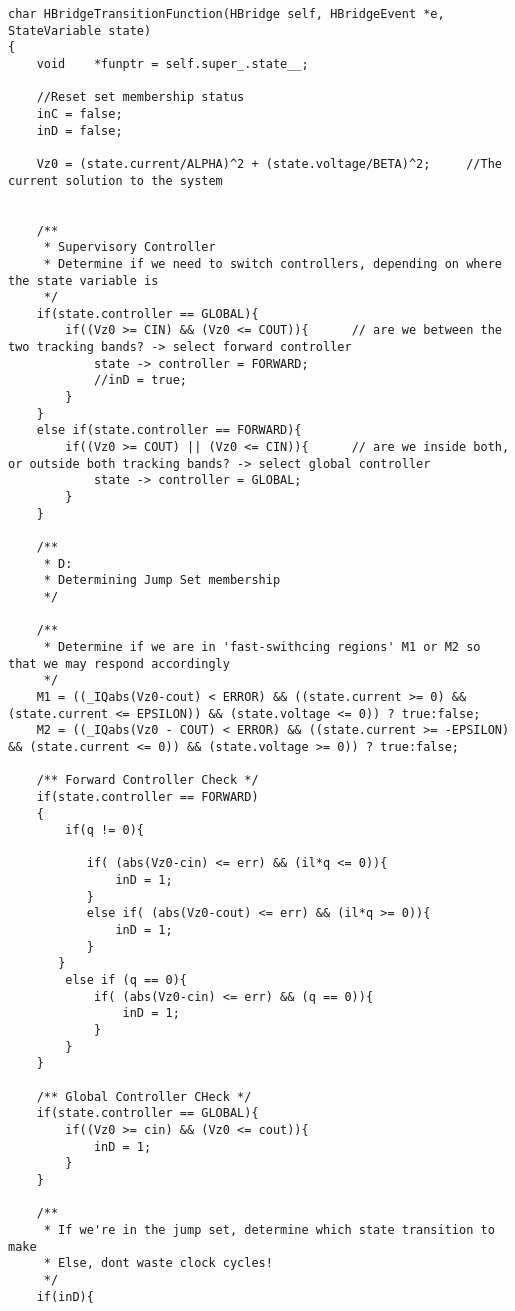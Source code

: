 \begin{lstlisting}
char HBridgeTransitionFunction(HBridge self, HBridgeEvent *e, StateVariable state)
{
    void    *funptr = self.super_.state__;    
    
    //Reset set membership status
    inC = false;   
    inD = false;

    Vz0 = (state.current/ALPHA)^2 + (state.voltage/BETA)^2;		//The current solution to the system


    /**
     * Supervisory Controller 
     * Determine if we need to switch controllers, depending on where the state variable is
     */
    if(state.controller == GLOBAL){
        if((Vz0 >= CIN) && (Vz0 <= COUT)){      // are we between the two tracking bands? -> select forward controller
            state -> controller = FORWARD;
            //inD = true;
        }
    }
    else if(state.controller == FORWARD){
        if((Vz0 >= COUT) || (Vz0 <= CIN)){      // are we inside both, or outside both tracking bands? -> select global controller
            state -> controller = GLOBAL;
        }
    }

    /**
     * D:
     * Determining Jump Set membership
     */
    
    /**
     * Determine if we are in 'fast-swithcing regions' M1 or M2 so that we may respond accordingly
     */
    M1 = ((_IQabs(Vz0-cout) < ERROR) && ((state.current >= 0) && (state.current <= EPSILON)) && (state.voltage <= 0)) ? true:false;
    M2 = ((_IQabs(Vz0 - COUT) < ERROR) && ((state.current >= -EPSILON) && (state.current <= 0)) && (state.voltage >= 0)) ? true:false;

    /** Forward Controller Check */
    if(state.controller == FORWARD)           
    {      
        if(q != 0){

           if( (abs(Vz0-cin) <= err) && (il*q <= 0)){
               inD = 1;
           }
           else if( (abs(Vz0-cout) <= err) && (il*q >= 0)){
               inD = 1;
           }
       }
        else if (q == 0){
            if( (abs(Vz0-cin) <= err) && (q == 0)){
                inD = 1;
            }
        }
    }

    /** Global Controller CHeck */
    if(state.controller == GLOBAL){
        if((Vz0 >= cin) && (Vz0 <= cout)){
            inD = 1;
        }
    }

    /**
     * If we're in the jump set, determine which state transition to make
     * Else, dont waste clock cycles!
     */
    if(inD){


\end{lstlisting}
